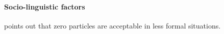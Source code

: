 \paragraph{Socio-linguistic factors}

 points out that zero particles are acceptable
in less formal situations.
%
